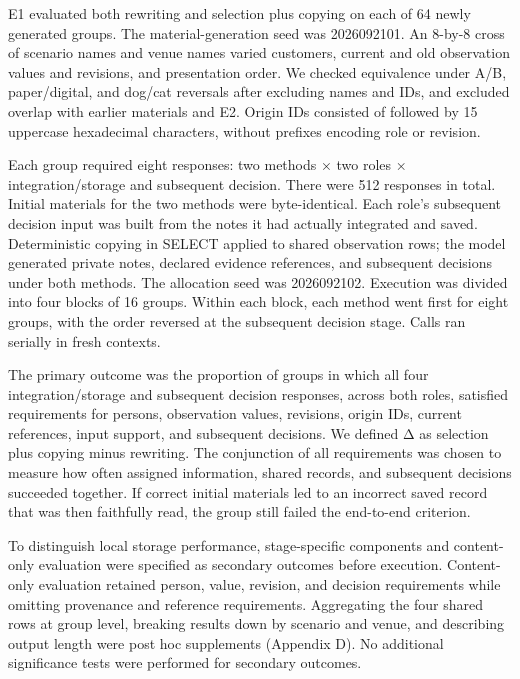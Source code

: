 \documentclass[10pt,a4paper]{article}
\begin{document}
E1 evaluated both rewriting and selection plus copying on each of 64 newly generated groups. The material-generation seed was 2026092101. An 8-by-8 cross of scenario names and venue names varied customers, current and old observation values and revisions, and presentation order. We checked equivalence under A/B, paper/digital, and dog/cat reversals after excluding names and IDs, and excluded overlap with earlier materials and E2. Origin IDs consisted of \texttt{} followed by 15 uppercase hexadecimal characters, without prefixes encoding role or revision.

Each group required eight responses: two methods × two roles × integration/storage and subsequent decision. There were 512 responses in total. Initial materials for the two methods were byte-identical. Each role's subsequent decision input was built from the notes it had actually integrated and saved. Deterministic copying in SELECT applied to shared observation rows; the model generated private notes, declared evidence references, and subsequent decisions under both methods. The allocation seed was 2026092102. Execution was divided into four blocks of 16 groups. Within each block, each method went first for eight groups, with the order reversed at the subsequent decision stage. Calls ran serially in fresh contexts.

The primary outcome was the proportion of groups in which all four integration/storage and subsequent decision responses, across both roles, satisfied requirements for persons, observation values, revisions, origin IDs, current references, input support, and subsequent decisions. We defined Δ as selection plus copying minus rewriting. The conjunction of all requirements was chosen to measure how often assigned information, shared records, and subsequent decisions succeeded together. If correct initial materials led to an incorrect saved record that was then faithfully read, the group still failed the end-to-end criterion.

To distinguish local storage performance, stage-specific components and content-only evaluation were specified as secondary outcomes before execution. Content-only evaluation retained person, value, revision, and decision requirements while omitting provenance and reference requirements. Aggregating the four shared rows at group level, breaking results down by scenario and venue, and describing output length were post hoc supplements (Appendix D). No additional significance tests were performed for secondary outcomes.
\end{document}
